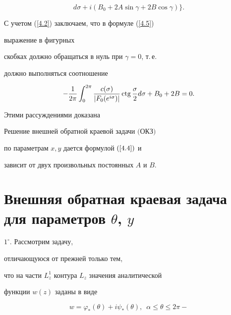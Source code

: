 {\begin{equation}
d\sigma +


i(B_{0}+2A\sin\gamma+2B\cos\gamma) \bigg\}.


\end{equation}





С учетом (\ref{4.2}) заключаем, что в формуле (\ref{4.5})


выражение в фигурных


скобках должно обращаться в нуль при $\gamma =0$, т.\,е.


должно выполняться соотношение


$$


-\frac{1}{2\pi}\int_{0}^{2\pi}


\frac{c(\sigma)}{|F_{0}(e^{i\sigma})|}\ctg \frac{\sigma}{2}d\sigma


+B_{0}+2B=0.


$$





Этими рассуждениями доказана 





\begin{thm}


Решение внешней обратной краевой задачи $($ОКЗ$)$


по параметрам $x, y$ дается формулой $(\ref{4.4})$ и 


зависит от двух произвольных постоянных $A$ и $B$.


\end{thm}





\section{Внешняя обратная краевая задача для параметров $\theta$, $y$}





$1^{\circ}$. Рассмотрим задачу,


отличающуюся от прежней только тем,


что на части $L_{z}^{1}$ контура $L_{z}$ значения аналитической


функции $w(z)$ заданы в виде


\begin{equation}\label{7.1}


w=\varphi_{*}(\theta) +i\psi_{*}(\theta),\ \;\alpha\leq\theta\leq 2\pi -



\end{equation}}
